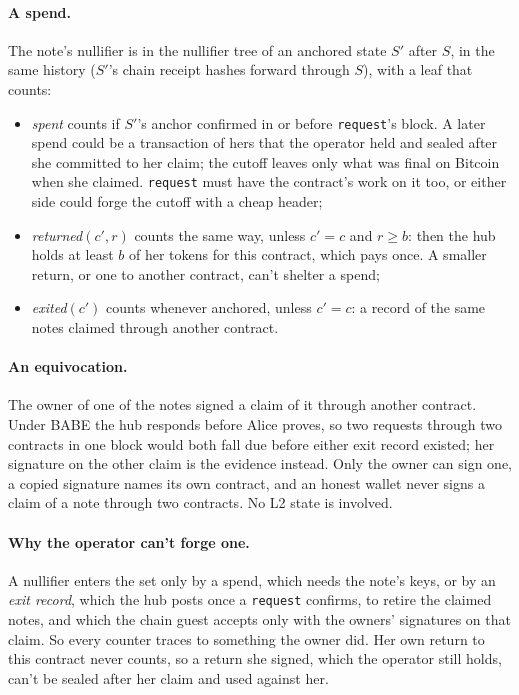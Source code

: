 \documentclass[11pt]{article}
\newcommand{\tx}[1]{\texttt{#1}}
\begin{document}
\paragraph{A spend.} The note's nullifier is in the nullifier tree of an
anchored state $S'$ after $S$, in the same history ($S'$'s chain receipt
hashes forward through $S$), with a leaf that counts:
\begin{itemize}[leftmargin=1.5em]
\item \emph{spent} counts if $S'$'s anchor confirmed in or before
  \tx{request}'s block. A later spend could be a transaction of hers that
  the operator held and sealed after she committed to her claim; the
  cutoff leaves only what was final on Bitcoin when she claimed.
  \tx{request} must have the contract's work on it too, or either side
  could forge the cutoff with a cheap header;
\item \emph{returned}$(c', r)$ counts the same way, unless $c' = c$ and
  $r \ge b$: then the hub holds at least $b$ of her tokens for this
  contract, which pays once. A smaller return, or one to another
  contract, can't shelter a spend;
\item \emph{exited}$(c')$ counts whenever anchored, unless $c' = c$: a
  record of the same notes claimed through another contract.
\end{itemize}

\paragraph{An equivocation.} The owner of one of the notes signed a
claim of it through another contract. Under BABE the hub responds before
Alice proves, so two requests through two contracts in one block would
both fall due before either exit record existed; her signature on the
other claim is the evidence instead. Only the owner can sign one, a
copied signature names its own contract, and an honest wallet never
signs a claim of a note through two contracts. No L2 state is involved.

\paragraph{Why the operator can't forge one.} A nullifier enters the set
only by a spend, which needs the note's keys, or by an \emph{exit
record}, which the hub posts once a \tx{request} confirms, to retire the
claimed notes, and which the chain guest accepts only with the owners'
signatures on that claim. So every counter traces to something the
owner did. Her own return to this contract never counts, so a return
she signed, which the operator still holds, can't be sealed after her
claim and used against her.
\end{document}

